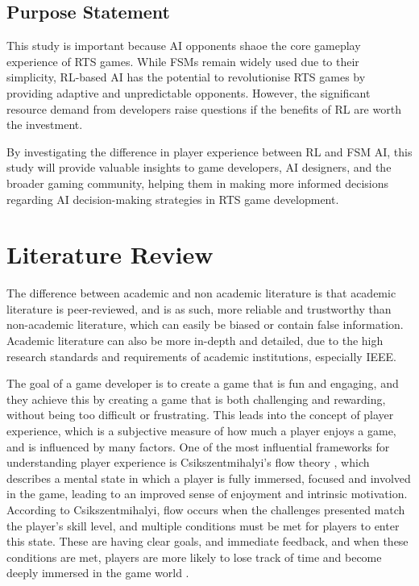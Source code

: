 \documentclass[conference]{IEEEtran}
\begin{document}
\subsection{Purpose Statement}

This study is important because AI opponents shaoe the core gameplay experience of RTS games. While FSMs remain widely used due to their simplicity, RL-based AI has the potential to revolutionise
RTS games by providing adaptive and unpredictable opponents. However, the significant resource demand from developers raise questions if the benefits of RL are worth the investment.

By investigating the difference in player experience between RL and FSM AI, this study will provide valuable insights to game developers, AI designers, and the broader gaming community, helping them
in making more informed decisions regarding AI decision-making strategies in RTS game development.

\section{Literature Review}

The difference between academic and non academic literature is that academic literature is peer-reviewed, and is as such, more reliable and trustworthy
than non-academic literature, which can easily be biased or contain false information. Academic literature can also be more in-depth and detailed, due to
the high research standards and requirements of academic institutions, especially IEEE.

The goal of a game developer is to create a game that is fun and engaging, and they achieve this by creating a game that is both challenging and rewarding, without being too difficult or frustrating.
This leads into the concept of player experience, which is a subjective measure of how much a player enjoys a game, and is influenced by many factors. One of the most influential frameworks for understanding player
experience is Csikszentmihalyi's flow theory \cite{csikszentmihalyi_flow_1990}, which describes a mental state in which a player is fully immersed, focused and involved in the game, leading to an improved sense of
enjoyment and intrinsic motivation. According to Csikszentmihalyi, flow occurs when the challenges presented match the player's skill level, and multiple conditions must be met for players to enter this state.
These are having clear goals, and immediate feedback, and when these conditions are met, players are more likely to lose track of time and become deeply immersed in the game world \cite{csikszentmihalyi_flow_1990}.
\end{document}
